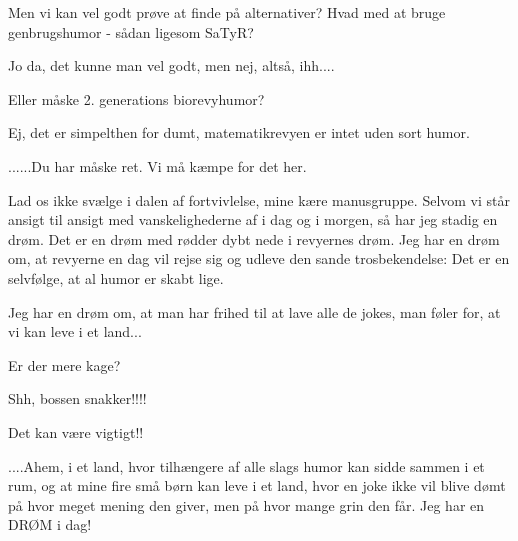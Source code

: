 \documentclass[a4paper,11pt]{article}
\begin{document}
\begin{sketch}

 Men vi kan vel godt prøve at finde på alternativer? Hvad med at bruge genbrugshumor - sådan ligesom SaTyR?

 Jo da, det kunne man vel godt, men nej, altså, ihh....

 Eller måske 2. generations biorevyhumor?


 Ej, det er simpelthen for dumt, matematikrevyen er intet uden sort humor.

 ......Du har måske ret. Vi må kæmpe for det her.


 Lad os ikke svælge i dalen af fortvivlelse, mine kære manusgruppe. Selvom vi står ansigt til ansigt med vanskelighederne af i dag og i morgen, så har jeg stadig en drøm. Det er en drøm med rødder dybt nede i revyernes drøm. Jeg har en drøm om, at revyerne en dag vil rejse sig og udleve den sande trosbekendelse: Det er en selvfølge, at al humor er skabt lige.


 Jeg har en drøm om, at man har frihed til at lave alle de jokes, man føler for, at vi kan leve i et land...

 Er der mere kage?

 Shh, bossen snakker!!!!


 Det kan være vigtigt!!

 ....Ahem, i et land, hvor tilhængere af alle slags humor kan sidde sammen i et rum, og at mine fire små børn kan leve i et land, hvor en joke ikke vil blive dømt på hvor meget mening den giver, men på hvor mange grin den får. Jeg har en DRØM i dag!

\end{sketch}
\end{document}
